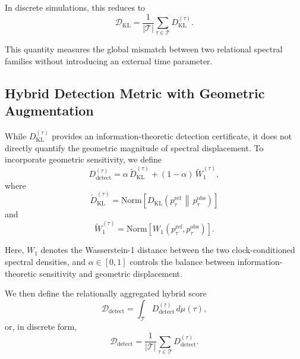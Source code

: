 \documentclass[11pt,a4paper]{article}
\theoremstyle{definition}
\theoremstyle{remark}
\begin{document}
In discrete simulations, this reduces to
\begin{equation}
  \mathcal{D}_{\mathrm{KL}}
    = \frac{1}{|\mathcal{T}|} \sum_{\tau \in \mathcal{T}} D_{\mathrm{KL}}^{(\tau)}.
\end{equation}

This quantity measures the global mismatch between two relational spectral families without
introducing an external time parameter.

\subsection{Hybrid Detection Metric with Geometric Augmentation}

While $D_{\mathrm{KL}}^{(\tau)}$ provides an information-theoretic detection certificate, it
does not directly quantify the geometric magnitude of spectral displacement.  To incorporate
geometric sensitivity, we define
\begin{equation}
  D_{\mathrm{detect}}^{(\tau)}
    = \alpha\,\widetilde{D}_{\mathrm{KL}}^{(\tau)}
      + (1-\alpha)\,\widetilde{W}_1^{(\tau)},
\end{equation}
where
\begin{equation}
  \widetilde{D}_{\mathrm{KL}}^{(\tau)}
    = \mathrm{Norm}\!\left[
        D_{\mathrm{KL}}\!\left(p_{\tau}^{\mathrm{ref}} \,\middle\|\, p_{\tau}^{\mathrm{obs}}\right)
      \right]
\end{equation}
and
\begin{equation}
  \widetilde{W}_1^{(\tau)}
    = \mathrm{Norm}\!\left[
        W_1\!\left(p_{\tau}^{\mathrm{ref}}, p_{\tau}^{\mathrm{obs}}\right)
      \right].
\end{equation}

Here, $W_1$ denotes the Wasserstein-1 distance between the two clock-conditioned spectral
densities, and $\alpha \in [0,1]$ controls the balance between information-theoretic
sensitivity and geometric displacement.

We then define the relationally aggregated hybrid score
\begin{equation}
  \mathcal{D}_{\mathrm{detect}}
    = \int_{\mathcal{T}} D_{\mathrm{detect}}^{(\tau)}\,d\mu(\tau),
\end{equation}
or, in discrete form,
\begin{equation}
  \mathcal{D}_{\mathrm{detect}}
    = \frac{1}{|\mathcal{T}|} \sum_{\tau \in \mathcal{T}} D_{\mathrm{detect}}^{(\tau)}.
\end{equation}
\end{document}
